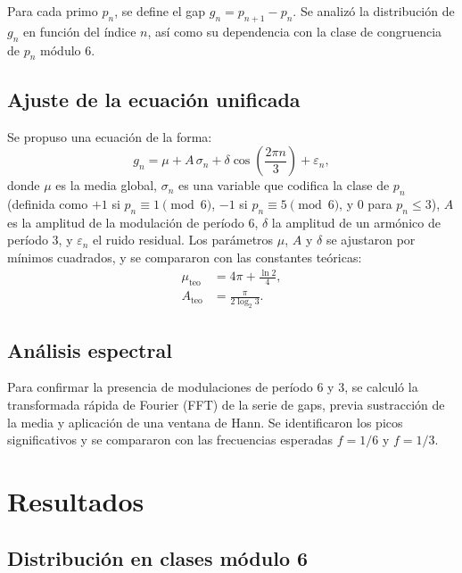 \documentclass[12pt,a4paper]{article}
\theoremstyle{plain}
\theoremstyle{definition}
\theoremstyle{remark}
\begin{document}
Para cada primo $p_n$, se define el gap $g_n = p_{n+1} - p_n$. Se analizó la distribución de $g_n$ en función del índice $n$, así como su dependencia con la clase de congruencia de $p_n$ módulo 6.

\subsection{Ajuste de la ecuación unificada}

Se propuso una ecuación de la forma:
\begin{equation}
g_n = \mu + A\,\sigma_n + \delta\cos\left(\frac{2\pi n}{3}\right) + \varepsilon_n,
\end{equation}
donde $\mu$ es la media global, $\sigma_n$ es una variable que codifica la clase de $p_n$ (definida como $+1$ si $p_n \equiv 1 \pmod{6}$, $-1$ si $p_n \equiv 5 \pmod{6}$, y $0$ para $p_n \leq 3$), $A$ es la amplitud de la modulación de período 6, $\delta$ la amplitud de un armónico de período 3, y $\varepsilon_n$ el ruido residual. Los parámetros $\mu$, $A$ y $\delta$ se ajustaron por mínimos cuadrados, y se compararon con las constantes teóricas:
\begin{align}
\mu_{\text{teo}} &= 4\pi + \frac{\ln 2}{4}, \\
A_{\text{teo}} &= \frac{\pi}{2\log_2 3}.
\end{align}

\subsection{Análisis espectral}

Para confirmar la presencia de modulaciones de período 6 y 3, se calculó la transformada rápida de Fourier (FFT) de la serie de gaps, previa sustracción de la media y aplicación de una ventana de Hann. Se identificaron los picos significativos y se compararon con las frecuencias esperadas $f = 1/6$ y $f = 1/3$.

\section{Resultados}

\subsection{Distribución en clases módulo 6}
\end{document}
